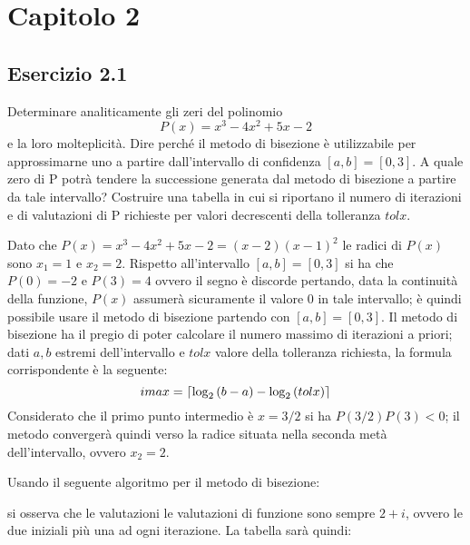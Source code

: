 \section{Capitolo 2}


	\subsection{Esercizio 2.1}

Determinare analiticamente gli zeri del polinomio 
\begin{equation*}
	P(x) = x^3 - 4x^2 + 5x - 2
\end{equation*}
 e la loro molteplicità. Dire perché il metodo di bisezione è utilizzabile per approssimarne uno a partire dall’intervallo di confidenza $[a,b]=[0,3]$. A quale zero di P potrà tendere la successione generata dal metodo di bisezione a partire da tale intervallo? Costruire una tabella in cui si riportano il numero di iterazioni e di valutazioni di P richieste per valori decrescenti della tolleranza $tolx$.

Dato che $P(x) = x^3 - 4x^2 + 5x - 2 = (x-2)(x-1)^2$ le radici di $P(x)$ sono $x_1=1$ e $x_2=2$. Rispetto all'intervallo $[a,b]=[0,3]$ si ha che $P(0) = -2$ e $P(3)=4$ ovvero il segno è discorde pertando, data la continuità della funzione, $P(x)$ assumerà sicuramente il valore $0$ in tale intervallo; è quindi possibile usare il metodo di bisezione partendo con $[a,b] = [0,3].$
Il metodo di bisezione ha il pregio di poter calcolare il numero massimo di iterazioni a priori; dati $a,b$ estremi dell'intervallo e $tolx$ valore della tolleranza richiesta, la formula corrispondente è la seguente:
\begin{equation*}
	imax= \lceil\log_2{(b-a)}-\log_2{(tolx)}\rceil
\end{equation*}
Considerato che il primo punto intermedio è $x=3/2$ si ha $P(3/2)P(3)<0$; il metodo convergerà quindi verso la radice situata nella seconda metà dell'intervallo, ovvero $x_2=2$.

Usando il seguente algoritmo per il metodo di bisezione:

si osserva che le valutazioni le valutazioni di funzione sono sempre $2+i$, ovvero le due iniziali più una ad ogni iterazione. La tabella sarà quindi:

